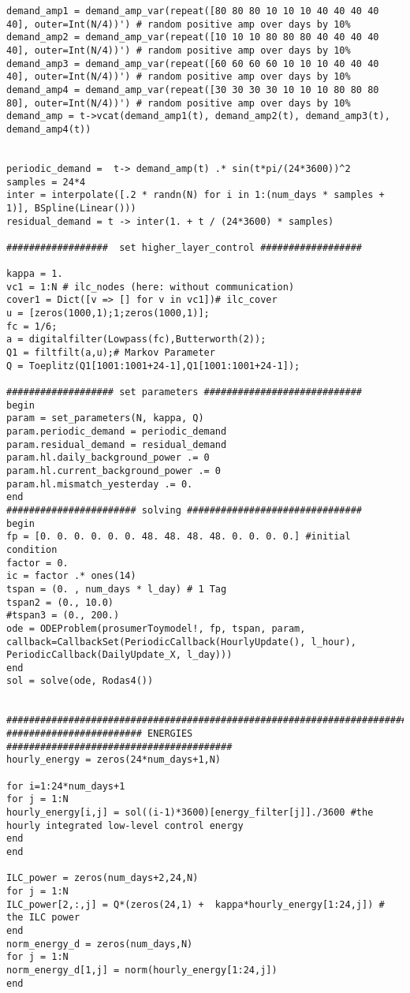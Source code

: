 \begin{lstlisting}
demand_amp1 = demand_amp_var(repeat([80 80 80 10 10 10 40 40 40 40 40], outer=Int(N/4))') # random positive amp over days by 10%
demand_amp2 = demand_amp_var(repeat([10 10 10 80 80 80 40 40 40 40 40], outer=Int(N/4))') # random positive amp over days by 10%
demand_amp3 = demand_amp_var(repeat([60 60 60 60 10 10 10 40 40 40 40], outer=Int(N/4))') # random positive amp over days by 10%
demand_amp4 = demand_amp_var(repeat([30 30 30 30 10 10 10 80 80 80 80], outer=Int(N/4))') # random positive amp over days by 10%
demand_amp = t->vcat(demand_amp1(t), demand_amp2(t), demand_amp3(t), demand_amp4(t))


periodic_demand =  t-> demand_amp(t) .* sin(t*pi/(24*3600))^2
samples = 24*4
inter = interpolate([.2 * randn(N) for i in 1:(num_days * samples + 1)], BSpline(Linear()))
residual_demand = t -> inter(1. + t / (24*3600) * samples)

##################  set higher_layer_control ##################

kappa = 1.
vc1 = 1:N # ilc_nodes (here: without communication)
cover1 = Dict([v => [] for v in vc1])# ilc_cover
u = [zeros(1000,1);1;zeros(1000,1)];
fc = 1/6;
a = digitalfilter(Lowpass(fc),Butterworth(2));
Q1 = filtfilt(a,u);# Markov Parameter
Q = Toeplitz(Q1[1001:1001+24-1],Q1[1001:1001+24-1]);

################### set parameters ############################
begin
param = set_parameters(N, kappa, Q)
param.periodic_demand = periodic_demand
param.residual_demand = residual_demand
param.hl.daily_background_power .= 0
param.hl.current_background_power .= 0
param.hl.mismatch_yesterday .= 0.
end
####################### solving ###############################
begin
fp = [0. 0. 0. 0. 0. 0. 48. 48. 48. 48. 0. 0. 0. 0.] #initial condition
factor = 0.
ic = factor .* ones(14)
tspan = (0. , num_days * l_day) # 1 Tag
tspan2 = (0., 10.0)
#tspan3 = (0., 200.)
ode = ODEProblem(prosumerToymodel!, fp, tspan, param,
callback=CallbackSet(PeriodicCallback(HourlyUpdate(), l_hour),
PeriodicCallback(DailyUpdate_X, l_day)))
end
sol = solve(ode, Rodas4())


#################################################################################
######################## ENERGIES ########################################
hourly_energy = zeros(24*num_days+1,N)

for i=1:24*num_days+1
for j = 1:N
hourly_energy[i,j] = sol((i-1)*3600)[energy_filter[j]]./3600 #the hourly integrated low-level control energy
end
end

ILC_power = zeros(num_days+2,24,N)
for j = 1:N
ILC_power[2,:,j] = Q*(zeros(24,1) +  kappa*hourly_energy[1:24,j]) # the ILC power
end
norm_energy_d = zeros(num_days,N)
for j = 1:N
norm_energy_d[1,j] = norm(hourly_energy[1:24,j])
end


\end{lstlisting}
